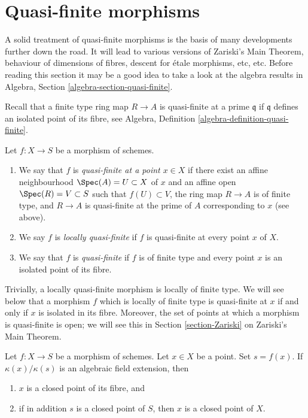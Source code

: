 \section{Quasi-finite morphisms}
\label{section-quasi-finite}

\noindent
A solid treatment of quasi-finite morphisms is the basis of many developments
further down the road. It will lead to various versions of Zariski's Main
Theorem, behaviour of dimensions of fibres, descent for \'etale morphisms, etc,
etc. Before reading this section it may be a good idea to take a look at
the algebra results in Algebra, Section \ref{algebra-section-quasi-finite}.

\medskip\noindent
Recall that a finite type ring map $R \to A$ is quasi-finite at
a prime $\mathfrak q$ if $\mathfrak q$ defines an isolated point
of its fibre, see Algebra, Definition \ref{algebra-definition-quasi-finite}.

\begin{definition}
\label{definition-quasi-finite}
\begin{reference}
\cite[II Definition 6.2.3]{EGA}
\end{reference}
Let $f : X \to S$ be a morphism of schemes.
\begin{enumerate}
\item We say that $f$ is {\it quasi-finite at a point $x \in X$}
if there exist an affine neighbourhood $\Spec(A) = U \subset X$
of $x$ and an affine open $\Spec(R) = V \subset S$ such that
$f(U) \subset V$, the ring map $R \to A$ is of finite type,
and $R \to A$ is quasi-finite at the prime of $A$ corresponding to $x$
(see above).
\item We say $f$ is {\it locally quasi-finite} if $f$ is
quasi-finite at every point $x$ of $X$.
\item We say that $f$ is {\it quasi-finite} if $f$ is of finite type
and every point $x$ is an isolated point of its fibre.
\end{enumerate}
\end{definition}

\noindent
Trivially, a locally quasi-finite morphism is locally of finite type.
We will see below that a morphism $f$ which is locally of finite type
is quasi-finite at $x$ if and only if $x$ is isolated in its fibre.
Moreover, the set of points at which a morphism is quasi-finite is open;
we will see this in Section \ref{section-Zariski} on Zariski's Main Theorem.

\begin{lemma}
\label{lemma-algebraic-residue-field-extension-closed-point-fibre}
Let $f : X \to S$ be a morphism of schemes.
Let $x \in X$ be a point. Set $s = f(x)$.
If $\kappa(x)/\kappa(s)$
is an algebraic field extension, then
\begin{enumerate}
\item $x$ is a closed point of its fibre, and
\item if in addition $s$ is a closed point of $S$, then
$x$ is a closed point of $X$.
\end{enumerate}
\end{lemma}


